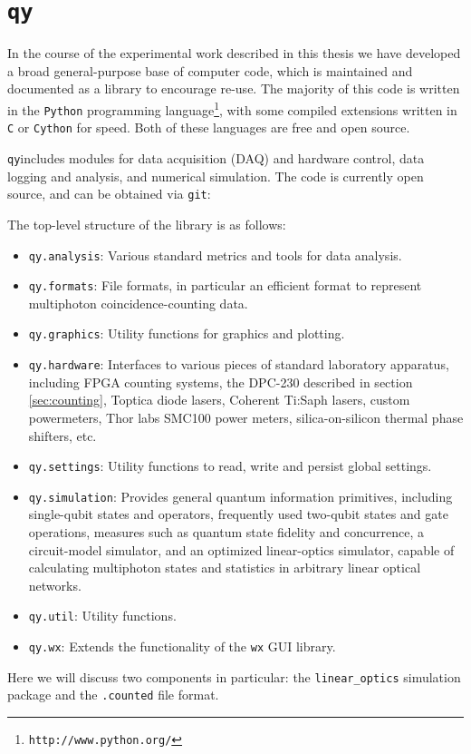 \newcommand{\qy}{\texttt{qy}}
\chapter{\qy}
\label{app:qy}

In the course of the experimental work described in this thesis we have developed a broad general-purpose base of computer code, which is maintained and documented as a library to encourage re-use. The majority of this code is written in the \texttt{Python} programming language\footnote{\texttt{http://www.python.org/}}, with some compiled extensions written in \texttt{C} or \texttt{Cython} for speed. Both of these languages are free and open source.

\qy includes modules for data acquisition (DAQ) and hardware control, data logging and analysis, and numerical simulation. The code is currently open source, and can be obtained via \texttt{git}:
\begin{center}
\par
\end{center}
The top-level structure of the library is as follows:
\begin{itemize}
    \item \texttt{qy.analysis}: Various standard metrics and tools for data analysis.
    \item \texttt{qy.formats}: File formats, in particular an efficient format to represent multiphoton coincidence-counting data.
    \item \texttt{qy.graphics}: Utility functions for graphics and plotting.
    \item \texttt{qy.hardware}: Interfaces to various pieces of standard laboratory apparatus, including FPGA counting systems, the DPC-230 described in section \ref{sec:counting}, Toptica diode lasers, Coherent Ti:Saph lasers, custom powermeters, Thor labs SMC100 power meters, silica-on-silicon thermal phase shifters, etc.
    \item \texttt{qy.settings}: Utility functions to read, write and persist global settings.
    \item \texttt{qy.simulation}: Provides general quantum information primitives, including single-qubit states and operators, frequently used two-qubit states and gate operations, measures such as quantum state fidelity and concurrence, a circuit-model simulator, and an optimized linear-optics simulator, capable of calculating multiphoton states and statistics in arbitrary linear optical networks.
    \item \texttt{qy.util}: Utility functions.
    \item \texttt{qy.wx}: Extends the functionality of the \texttt{wx} GUI library.
\end{itemize}
Here we will discuss two components in particular: the \texttt{linear\_optics} simulation package and the \texttt{.counted} file format.

